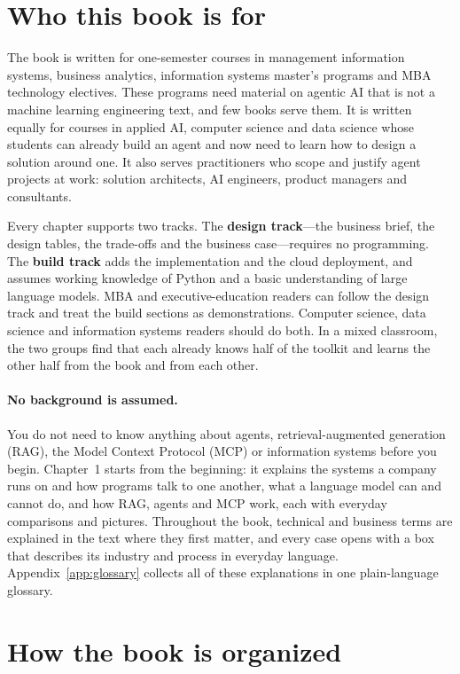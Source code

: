 \section*{Who this book is for}

The book is written for one-semester courses in management information systems, business analytics, information systems master's programs and MBA technology electives. These programs need material on agentic AI that is not a machine learning engineering text, and few books serve them. It is written equally for courses in applied AI, computer science and data science whose students can already build an agent and now need to learn how to design a solution around one. It also serves practitioners who scope and justify agent projects at work: solution architects, AI engineers, product managers and consultants.

Every chapter supports two tracks. The \textbf{design track}---the business brief, the design tables, the trade-offs and the business case---requires no programming. The \textbf{build track} adds the implementation and the cloud deployment, and assumes working knowledge of Python and a basic understanding of large language models. MBA and executive-education readers can follow the design track and treat the build sections as demonstrations. Computer science, data science and information systems readers should do both. In a mixed classroom, the two groups find that each already knows half of the toolkit and learns the other half from the book and from each other.

\paragraph{No background is assumed.} You do not need to know anything about agents, retrieval-augmented generation (RAG), the Model Context Protocol (MCP) or information systems before you begin. Chapter~1 starts from the beginning: it explains the systems a company runs on and how programs talk to one another, what a language model can and cannot do, and how RAG, agents and MCP work, each with everyday comparisons and pictures. Throughout the book, technical and business terms are explained in the text where they first matter, and every case opens with a box that describes its industry and process in everyday language. Appendix~\ref{app:glossary} collects all of these explanations in one plain-language glossary.

\section*{How the book is organized}

